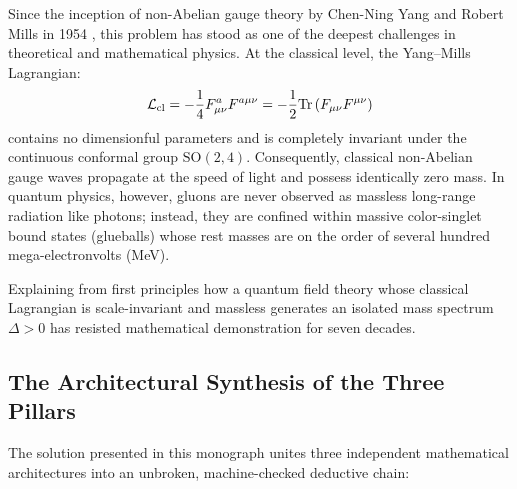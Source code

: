 Since the inception of non-Abelian gauge theory by Chen-Ning Yang and Robert Mills in 1954 \cite{YangMills1954}, this problem has stood as one of the deepest challenges in theoretical and mathematical physics. At the classical level, the Yang--Mills Lagrangian:
\begin{equation}
\label{eq:classical_ym_lagrangian_intro}
\mathcal{L}_{\mathrm{cl}} = -\frac{1}{4} F_{\mu\nu}^a F^{a\mu\nu} = -\frac{1}{2} \mathrm{Tr}\left( F_{\mu\nu} F^{\mu\nu} \right)
\end{equation}
contains no dimensionful parameters and is completely invariant under the continuous conformal group $\mathrm{SO}(2, 4)$. Consequently, classical non-Abelian gauge waves propagate at the speed of light and possess identically zero mass. In quantum physics, however, gluons are never observed as massless long-range radiation like photons; instead, they are confined within massive color-singlet bound states (glueballs) whose rest masses are on the order of several hundred mega-electronvolts (MeV). 

Explaining from first principles how a quantum field theory whose classical Lagrangian is scale-invariant and massless generates an isolated mass spectrum $\Delta > 0$ has resisted mathematical demonstration for seven decades.

\subsection{The Architectural Synthesis of the Three Pillars}
\label{subsec:architectural_synthesis_three_pillars}

The solution presented in this monograph unites three independent mathematical architectures into an unbroken, machine-checked deductive chain:

